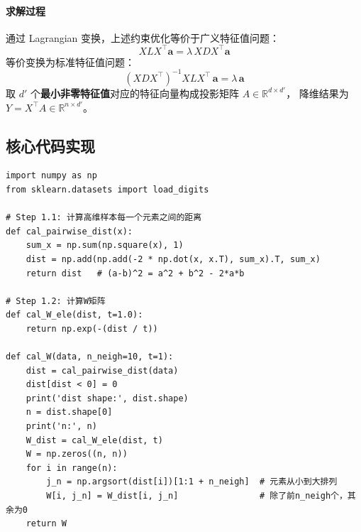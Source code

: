 \documentclass[10.5pt]{config}
\begin{document}
\paragraph{求解过程}
通过 Lagrangian 变换，上述约束优化等价于广义特征值问题：
$$X L X^\top \mathbf{a} = \lambda\, X D X^\top \mathbf{a}$$
等价变换为标准特征值问题：
$$(X D X^\top)^{-1} X L X^\top\, \mathbf{a} = \lambda\, \mathbf{a}$$
取 $d'$ 个\textbf{最小非零特征值}对应的特征向量构成投影矩阵 $A \in \mathbb{R}^{d \times d'}$，
降维结果为 $Y = X^\top A \in \mathbb{R}^{n \times d'}$。

\subsection{核心代码实现}

\begin{listing}[H]
\begin{verbatim}
import numpy as np
from sklearn.datasets import load_digits

# Step 1.1: 计算高维样本每一个元素之间的距离
def cal_pairwise_dist(x):
    sum_x = np.sum(np.square(x), 1)
    dist = np.add(np.add(-2 * np.dot(x, x.T), sum_x).T, sum_x)
    return dist   # (a-b)^2 = a^2 + b^2 - 2*a*b

# Step 1.2: 计算W矩阵
def cal_W_ele(dist, t=1.0):
    return np.exp(-(dist / t))

def cal_W(data, n_neigh=10, t=1):
    dist = cal_pairwise_dist(data)
    dist[dist < 0] = 0
    print('dist shape:', dist.shape)
    n = dist.shape[0]
    print('n:', n)
    W_dist = cal_W_ele(dist, t)
    W = np.zeros((n, n))
    for i in range(n):
        j_n = np.argsort(dist[i])[1:1 + n_neigh]  # 元素从小到大排列
        W[i, j_n] = W_dist[i, j_n]                # 除了前n_neigh个，其余为0
    return W
\end{verbatim}
\caption{LPP Step 1——计算成对距离与权重矩阵 $W$}
\end{listing}
\end{document}
